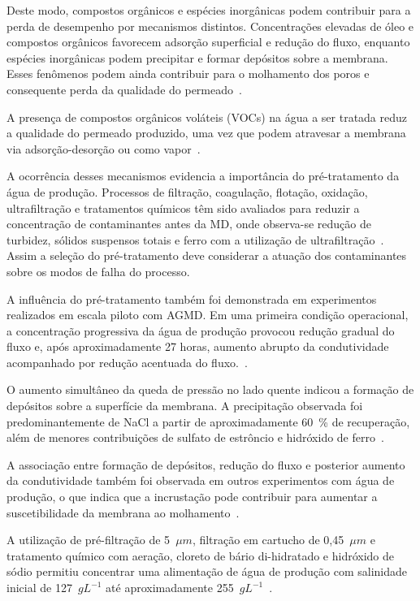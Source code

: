 Deste modo, compostos orgânicos e espécies inorgânicas podem contribuir para a perda de desempenho por mecanismos distintos. Concentrações elevadas de óleo e compostos orgânicos favorecem adsorção superficial e redução do fluxo, enquanto espécies inorgânicas podem precipitar e formar depósitos sobre a membrana. Esses fenômenos podem ainda contribuir para o molhamento dos poros e consequente perda da qualidade do permeado~\cite{Hsieh2021Pretreatments, Nawaz2021FO_MD}.

A presença de compostos orgânicos voláteis (VOCs) na água a ser tratada reduz a qualidade do permeado produzido, uma vez que podem atravesar a membrana via adsorção-desorção ou como vapor~\cite{Yao2018}.

A ocorrência desses mecanismos evidencia a importância do pré-tratamento da água de produção. Processos de filtração, coagulação, flotação, oxidação, ultrafiltração e tratamentos químicos têm sido avaliados para reduzir a concentração de contaminantes antes da MD, onde observa-se redução de turbidez, sólidos suspensos totais e ferro com a utilização de ultrafiltração~\cite{Hsieh2021Pretreatments, Nawaz2021FO_MD}. Assim a seleção do pré-tratamento deve considerar a atuação dos contaminantes sobre os modos de falha do processo.

A influência do pré-tratamento também foi demonstrada em experimentos realizados em escala piloto com AGMD. Em uma primeira condição operacional, a concentração progressiva da água de produção provocou redução gradual do fluxo e, após aproximadamente 27 horas, aumento abrupto da condutividade acompanhado por redução acentuada do fluxo.~\cite{Pawar2022AGMD}.

O aumento simultâneo da queda de pressão no lado quente indicou a formação de depósitos sobre a superfície da membrana. A precipitação observada foi predominantemente de NaCl a partir de aproximadamente 60~\% de recuperação, além de menores contribuições de sulfato de estrôncio e hidróxido de ferro~\cite{Pawar2022AGMD}.

A associação entre formação de depósitos, redução do fluxo e posterior aumento da condutividade também foi observada em outros experimentos com água de produção, o que indica que a incrustação pode contribuir para aumentar a suscetibilidade da membrana ao molhamento~\cite{Pawar2022, Regmi2023ProducedWater, Gryta2023}.

A utilização de pré-filtração de 5~$\mu m$, filtração em cartucho de 0,45~$\mu m$ e tratamento químico com aeração, cloreto de bário di-hidratado e hidróxido de sódio permitiu concentrar uma alimentação de água de produção com salinidade inicial de 127~$gL^{-1}$ até aproximadamente 255~$gL^{-1}$~\cite{Pawar2022AGMD}.

